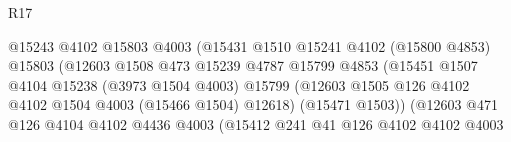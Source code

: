 \begin{lexlean}{R17}
\begin{coremodule}
                                            @15243
                                            @4102
                                            @15803
                                            @4003
                                            (@15431
                                              @1510
                                              @15241
                                              @4102
                                              (@15800 @4853)
                                              @15803
                                              (@12603
                                                @1508
                                                @473
                                                @15239
                                                @4787
                                                @15799
                                                @4853
                                                (@15451
                                                  @1507
                                                  @4104
                                                  @15238
                                                  (@3973 @1504 @4003)
                                                  @15799
                                                  (@12603
                                                    @1505
                                                    @126
                                                    @4102
                                                    @4102
                                                    @1504
                                                    @4003
                                                    (@15466 @1504)
                                                    @12618)
                                                  (@15471 @1503))
                                                (@12603
                                                  @471
                                                  @126
                                                  @4104
                                                  @4102
                                                  @4436
                                                  @4003
                                                  (@15412
                                                    @241
                                                    @41
                                                    @126
                                                    @4102
                                                    @4102
                                                    @4003

\end{coremodule}
\end{lexlean}
